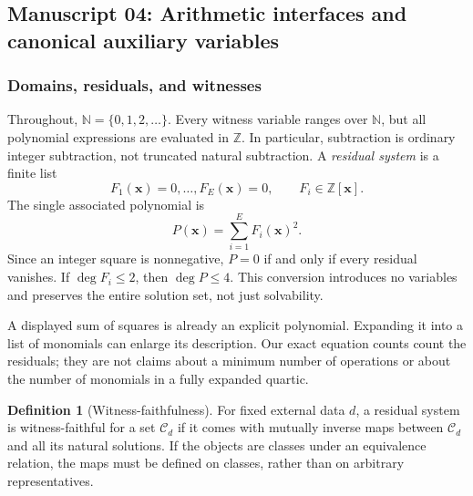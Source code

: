 \documentclass[11pt,a4paper]{article}
\theoremstyle{definition}
\newtheorem{definition}[definition]{Definition}
\theoremstyle{remark}
\newcommand{\N}{\mathbb N}
\newcommand{\Z}{\mathbb Z}
\begin{document}
\subsection{Manuscript 04: Arithmetic interfaces and canonical auxiliary variables}\label{cdc:wf:sec:interfaces}
\subsubsection{Domains, residuals, and witnesses}
Throughout, $\N=\{0,1,2,\ldots\}$. Every witness variable ranges over $\N$, but all polynomial expressions are evaluated in $\Z$. In particular, subtraction is ordinary integer subtraction, not truncated natural subtraction. A \emph{residual system} is a finite list
\begin{equation}\label{cdc:wf:eq:residual}
 F_1(\mathbf x)=0,\ldots,F_E(\mathbf x)=0,
 \qquad F_i\in\Z[\mathbf x].
\end{equation}
The single associated polynomial is
\begin{equation}\label{cdc:wf:eq:sos}
 P(\mathbf x)=\sum_{i=1}^{E}F_i(\mathbf x)^2.
\end{equation}
Since an integer square is nonnegative, $P=0$ if and only if every residual vanishes. If $\deg F_i\leq2$, then $\deg P\leq4$. This conversion introduces no variables and preserves the entire solution set, not just solvability.

A displayed sum of squares is already an explicit polynomial. Expanding it into a list of monomials can enlarge its description. Our exact equation counts count the residuals; they are not claims about a minimum number of operations or about the number of monomials in a fully expanded quartic.

\begin{definition}[Witness-faithfulness]
For fixed external data $d$, a residual system is witness-faithful for a set $\mathcal C_d$ if it comes with mutually inverse maps between $\mathcal C_d$ and all its natural solutions. If the objects are classes under an equivalence relation, the maps must be defined on classes, rather than on arbitrary representatives.
\end{definition}
\end{document}
